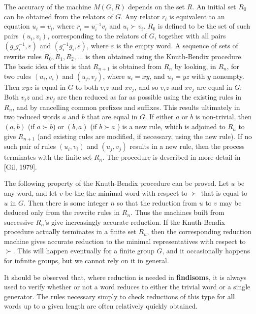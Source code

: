 The accuracy of the machine $M(G,R)$ depends on the set $R$.
An initial set $R_0$ can be obtained from the relators of $G$. Any relator
$r_i$ is equivalent to an equation $u_i = v_i$, where $r_i = u_i^{-1}v_i$
and $u_i \succ v_i$. $R_0$ is defined to be the set of such pairs 
$(u_i,v_i)$, corresponding to the relators of $G$, together with all 
pairs $(g_ig_i^{-1},\varepsilon )$ and $(g_i^{-1}g_i,\varepsilon )$, where
$\varepsilon$ is the empty word. A sequence of sets of rewrite
rules $R_0, R_1, R_2, \ldots $ is then obtained using the Knuth-Bendix
procedure. The basic idea of this is that $R_{n+1}$ is obtained from $R_n$ 
by looking, in $R_n$, for two rules $(u_i,v_i)$ and $(u_j,v_j)$, 
where $u_i = xy$, and $u_j = yz$ with $y$ nonempty. Then $xyz$ is
equal in $G$ to both $v_iz$ and $xv_j$, and so $v_iz$ and $xv_j$ are
equal in $G$.
Both $v_iz$ and $xv_j$ are then reduced
as far as possible using the existing rules in  $R_n$, and by cancelling common
prefixes and suffixes. This results ultimately in two reduced words
$a$ and $b$ that are equal in $G$.
If either $a$ or $b$ is
non-trivial, then $(a,b)$ (if $a \succ b$) or $(b,a)$ (if $b \succ a$ ) is
a new rule, which is adjoined to $R_n$ to give $R_{n+1}$ (and existing
rules are modified, if necessary, using the new rule). If no
such pair of rules $(u_i,v_i)$ and $(u_j,v_j)$ results in a new rule,
then the process terminates with the finite set $R_n$.
The procedure is described in more detail in [Gil, 1979].

The following property of the Knuth-Bendix procedure can be proved.
Let $u$ be any word, and let $v$ be the
the minimal word with respect to $\succ$ that is equal to $u$
in $G$. Then
there is some integer $n$ so that the reduction from $u$ to $v$ may be deduced
only from the rewrite rules in $R_n$. Thus the machines built from
successive $R_n$'s give increasingly accurate reduction.
If the Knuth-Bendix procedure actually terminates in a finite set $R_n$, then
the corresponding reduction machine
gives accurate reduction to the minimal representatives
with respect to $\succ$. This will happen eventually for a finite group $G$,
and it occasionally happens for infinite groups, but we cannot rely on it
in general.

It should be observed that, where reduction is needed in {\bf findisoms},
it is always used to verify whether or not a word reduces to either the
trivial word or a single generator. The rules necessary simply to check
reductions of this type for all words up to a given length are 
often relatively quickly obtained.

